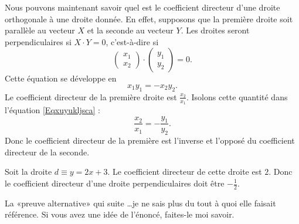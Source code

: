 Nous pouvons maintenant savoir quel est le coefficient directeur d'une droite orthogonale à une droite donnée. En effet, supposons que la première droite soit parallèle au vecteur \( X\) et la seconde au vecteur \( Y\). Les droites seront perpendiculaires si \( X\cdot Y=0\), c'est-à-dire si
\begin{equation}
	\begin{pmatrix}
		x_1 \\
		x_2
	\end{pmatrix}\cdot\begin{pmatrix}
		y_1 \\
		y_2
	\end{pmatrix}=0.
\end{equation}
Cette équation se développe en
\begin{equation}    \label{Eqxuyukljsca}
	x_1y_1=-x_2y_2.
\end{equation}
Le coefficient directeur de la première droite est \( \frac{ x_2 }{ x_1 }\). Isolons cette quantité dans l'équation \eqref{Eqxuyukljsca} :
\begin{equation}
	\frac{ x_2 }{ x_1 }=-\frac{ y_1 }{ y_2 }.
\end{equation}
Donc le coefficient directeur de la première est l'inverse et l'opposé du coefficient directeur de la seconde.

\begin{example}
	Soit la droite \( d\equiv y=2x+3\). Le coefficient directeur de cette droite est \( 2\). Donc le coefficient directeur d'une droite perpendiculaires doit être \( -\frac{ 1 }{ 2 }\).
\end{example}


\begin{probleme}
	La «preuve alternative» qui suite \ldots je ne sais plus du tout à quoi elle faisait référence. Si vous avez une idée de l'énoncé, faites-le moi savoir.
\end{probleme}

